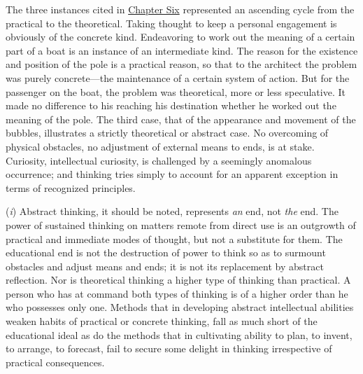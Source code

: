 \documentclass[letterpaper]{book}
\begin{document}
The three instances cited in
\protect\hyperlink{ux40publicux40vhostux40gux40gutenbergux40htmlux40filesux4037423ux4037423-hux4037423-h-2.htm.htmlux5cux23CHAPTER_SIX}{Chapter
Six} represented an ascending cycle from the practical to the
theoretical. Taking thought to keep a personal engagement is obviously
of the concrete kind. Endeavoring to work out the meaning of a certain
part of a boat is an instance of an intermediate kind. The reason for
the existence and position of the pole is a practical reason, so that to
the architect the problem was purely concrete---the maintenance of a
certain system of action. But for the passenger on the boat, the problem
was theoretical, more or less speculative. It made no difference to his
reaching his destination whether he worked out the meaning of the pole.
The third case, that of the appearance and movement of the bubbles,
illustrates a strictly theoretical or abstract case. No overcoming of
physical obstacles, no adjustment of external means to ends, is at
stake. Curiosity, intellectual curiosity, is challenged by a seemingly
anomalous occurrence; and thinking tries simply to account for an
apparent exception in terms of recognized principles.


(\emph{i}) Abstract thinking, it should be noted, represents \emph{an}
end, not \emph{the} end. The power of sustained thinking on matters
remote from direct use is an outgrowth of practical and immediate modes
of thought, but not a substitute for them. The educational end is not
the destruction of power to think so as to surmount obstacles and adjust
means and ends; it is not its replacement by abstract reflection. Nor is
theoretical thinking a higher type of thinking than practical. A person
who has at command both types of thinking is of a higher order than he
who possesses only one. Methods that in
developing
abstract intellectual abilities weaken habits of practical or concrete
thinking, fall as much short of the educational ideal as do the methods
that in cultivating ability to plan, to invent, to arrange, to forecast,
fail to secure some delight in thinking irrespective of practical
consequences.

\end{document}
